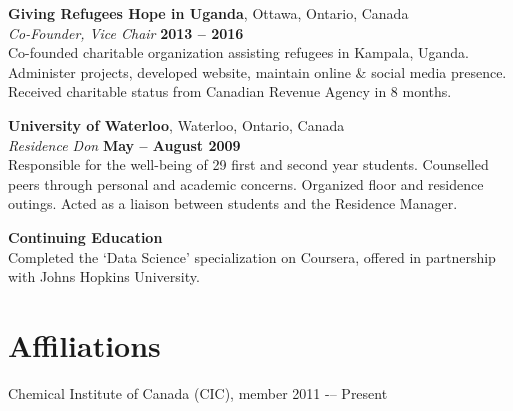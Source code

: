 \documentclass[margin,line]{resume}
\begin{document}
\begin{resume}
    \textbf{Giving Refugees Hope in Uganda}, Ottawa, Ontario, Canada\\\vspace{1mm}%
    \textsl{Co-Founder, Vice Chair} \hfill \textbf{2013 -- 2016}\\
    Co-founded charitable organization assisting refugees in Kampala, Uganda.
    Administer projects, developed website, maintain online \& social media presence.
    Received charitable status from Canadian Revenue Agency in 8 months.
    
    \textbf{University of Waterloo}, Waterloo, Ontario, Canada\\\vspace{1mm}%
    \textsl{Residence Don} \hfill \textbf{May -- August 2009}\\
    Responsible for the well-being of 29 first and second year students.
    Counselled peers through personal and academic concerns.
    Organized floor and residence outings.
    Acted as a liaison between students and the Residence Manager.

    \textbf{Continuing Education}\\
    Completed the `Data Science' specialization on Coursera, offered in partnership with Johns Hopkins University.
	
\vspace{1mm}
    \section{\mysidestyle Affiliations} 

    Chemical Institute of Canada (CIC), member 2011 -– Present


\end{resume}
\end{document}
